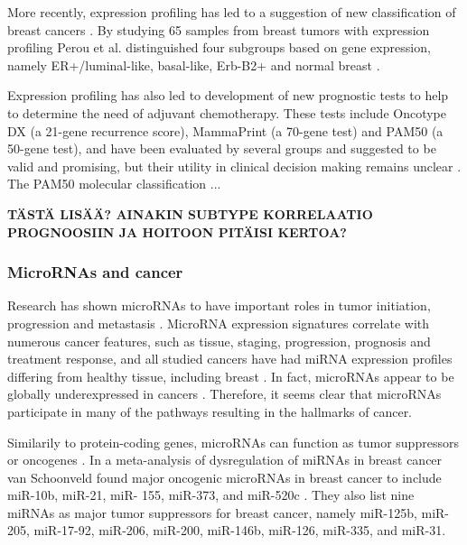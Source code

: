 More recently, expression profiling has led to a suggestion
of new classification of breast cancers \citep{Perou2000,Sorlie2001}. By studying 65
samples from breast tumors with expression profiling Perou et al.
distinguished four subgroups based on gene expression, namely
ER+/luminal-like, basal-like, Erb-B2+ and normal breast \citep{Perou2000}.

Expression profiling has also led to development of new prognostic tests to
help to determine the need of adjuvant chemotherapy. These tests include
Oncotype DX (a 21-gene recurrence score), MammaPrint (a 70-gene test) and PAM50
(a 50-gene test), and have been evaluated by several groups and suggested to be
valid and promising, but their utility in clinical decision making remains
unclear \citep{Azim2013}. The PAM50 molecular classification ... 

\textbf{TÄSTÄ LISÄÄ? AINAKIN SUBTYPE KORRELAATIO PROGNOOSIIN JA HOITOON PITÄISI
KERTOA?}






\subsubsection{MicroRNAs and cancer}

Research has shown microRNAs to have important roles in tumor initiation,
progression and metastasis \citep{Lin2015}. MicroRNA expression signatures
correlate with numerous cancer features, such as tissue, staging, 
progression, prognosis and treatment response, and all studied cancers
have had miRNA expression profiles differing from healthy tissue, including breast
\citep{Calin2006}. In fact, microRNAs appear to be globally underexpressed in
cancers \citep{Lu2005}. Therefore, it seems clear that microRNAs participate
in many of the pathways resulting in the hallmarks of cancer.

Similarily to protein-coding genes, microRNAs can function as tumor
suppressors or oncogenes \citep{Lin2015}. In a meta-analysis of dysregulation
of miRNAs in breast cancer van Schoonveld found major oncogenic microRNAs in
breast cancer to include miR-10b, miR-21, miR- 155, miR-373, and miR-520c
\citep{vanSchooneveld2015}. They also list nine miRNAs as major tumor suppressors for breast cancer,
namely miR-125b, miR-205, miR-17-92, miR-206, miR-200, miR-146b, miR-126,
miR-335, and miR-31.


